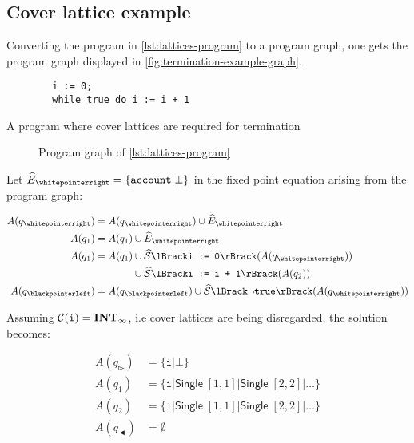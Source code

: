 \subsection{Cover lattice example}

Converting the program in \autoref{lst:lattices-program} to a program graph, one gets the program graph displayed in \autoref{fig:termination-example-graph}.

\begin{listing}
    \begin{verbatim}
        i := 0;
        while true do i := i + 1
    \end{verbatim}
    \caption{A program where cover lattices are required for termination}
    \label{lst:lattices-program}
\end{listing}

\begin{figure}
    \centering
    
    \caption{Program graph of \autoref{lst:lattices-program}}
    \label{fig:termination-example-graph}
\end{figure}

Let $\ab{E}_\whitepointerright = \{ \texttt{account} | \bot \}$ in the fixed point equation arising from the program graph:

\begin{align}
    A(q_\whitepointerright) &= A(q_\whitepointerright) \cup \ab{E}_\whitepointerright \\
    A(q_1) &= A(q_1) \cup \ab{E}_\whitepointerright \\
    A(q_1) &= \begin{aligned}[t]
        A(q_1) &\cup \abssem{\texttt{i := 0}}(A(q_\whitepointerright)) \\
        &\cup \abssem{\texttt{i := i + 1}}(A(q_2))
    \end{aligned} \\
    A(q_\blackpointerleft) &= A(q_\blackpointerleft) \cup \abssem{\neg\texttt{true}}(A(q_\whitepointerright))
\end{align}

Assuming $\mathcal{C}(\texttt{i}) = \mathbf{INT}_{\infty}$, i.e cover lattices are being disregarded, the solution becomes:

\begin{align}
    A(q_\whitepointerright) &= \{ \texttt{i} | \bot \} \\
    A(q_1) &= \{ \texttt{i} | \mathsf{Single} \; [1, 1] | \mathsf{Single} \; [2, 2] | \dots \} \\
    A(q_2) &= \{ \texttt{i} | \mathsf{Single} \; [1, 1] | \mathsf{Single} \; [2, 2] | \dots \} \\
    A(q_\blackpointerleft) &= \emptyset
\end{align}

